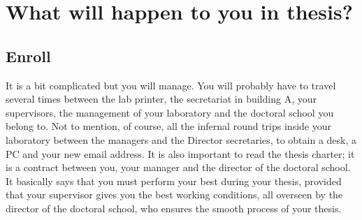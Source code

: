 \chapter{What will happen to you in thesis?}

\section{Enroll}
It is a bit complicated but you will manage.
You will probably have to travel several times between the lab printer, the secretariat in building A, your supervisors, the management of your laboratory and the doctoral school you belong to.
Not to mention, of course, all the infernal round trips inside your laboratory between the managers and the Director secretaries, to obtain a desk, a PC and your new email address.
It is also important to read the thesis charter; it is a contract between you, your manager and the director of the doctoral school.
It basically says that you must perform your best during your thesis, provided that your supervisor gives you the best working conditions, all overseen by the director of the doctoral school, who ensures the smooth process of your thesis.

